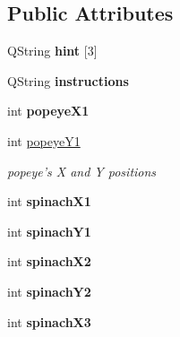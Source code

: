 \subsection*{Public Attributes}
\begin{DoxyCompactItemize}
\item 
\hypertarget{classlevels_a6a07ae56f660f054725780f8c6c98d4a}{Q\-String {\bfseries hint} \mbox{[}3\mbox{]}}\label{classlevels_a6a07ae56f660f054725780f8c6c98d4a}

\item 
\hypertarget{classlevels_a0b030ae621e2134027a38ae9071be3d8}{Q\-String {\bfseries instructions}}\label{classlevels_a0b030ae621e2134027a38ae9071be3d8}

\item 
\hypertarget{classlevels_a2d25044468ead143b92458188a88720d}{int {\bfseries popeye\-X1}}\label{classlevels_a2d25044468ead143b92458188a88720d}

\item 
\hypertarget{classlevels_a7e5dd0abebbfe2a2f1706c1e1ff45d31}{int \hyperlink{classlevels_a7e5dd0abebbfe2a2f1706c1e1ff45d31}{popeye\-Y1}}\label{classlevels_a7e5dd0abebbfe2a2f1706c1e1ff45d31}

\begin{DoxyCompactList}\small\item\em popeye's X and Y positions \end{DoxyCompactList}\item 
\hypertarget{classlevels_a73c8cdfbef251072bf35c7722d478356}{int {\bfseries spinach\-X1}}\label{classlevels_a73c8cdfbef251072bf35c7722d478356}

\item 
\hypertarget{classlevels_aaae2e10293156b0bc6352cab3752e7f4}{int {\bfseries spinach\-Y1}}\label{classlevels_aaae2e10293156b0bc6352cab3752e7f4}

\item 
\hypertarget{classlevels_a1a9a5432ebebde76cae16a6c66c72ca4}{int {\bfseries spinach\-X2}}\label{classlevels_a1a9a5432ebebde76cae16a6c66c72ca4}

\item 
\hypertarget{classlevels_a5fdb199dd540d4c6ae719a3abbb0a3bf}{int {\bfseries spinach\-Y2}}\label{classlevels_a5fdb199dd540d4c6ae719a3abbb0a3bf}

\item 
\hypertarget{classlevels_a8930bfc6fc9cc515afe6a3cbb926a60a}{int {\bfseries spinach\-X3}}\label{classlevels_a8930bfc6fc9cc515afe6a3cbb926a60a}


\end{DoxyCompactItemize}
